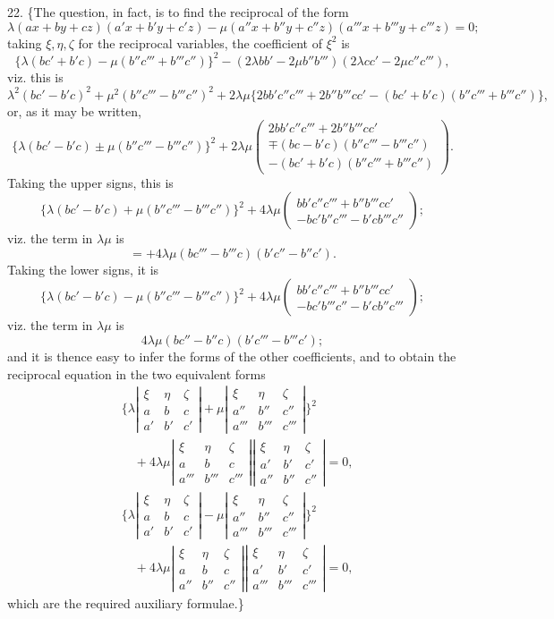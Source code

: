 \documentclass[11pt,a4paper]{article}
\newcommand{\Det}[1]{\left|\begin{matrix}#1\end{matrix}\right|}
\newcommand{\surf}[1]{\par\smallskip\noindent{\itshape \{Surface $#1$.\}}\par\smallskip}
\begin{document}
22. \{The question, in fact, is to find the reciprocal of the form
\[
\lambda(ax+by+cz)(a'x+b'y+c'z)
-\mu(a''x+b''y+c''z)(a'''x+b'''y+c'''z)=0;
\]
taking $\xi,\eta,\zeta$ for the reciprocal variables, the coefficient of $\xi^2$ is
\[
\{\lambda(bc'+b'c)-\mu(b''c'''+b'''c'')\}^2
-(2\lambda bb'-2\mu b''b''')(2\lambda cc'-2\mu c''c'''),
\]
viz. this is
\[
\lambda^2(bc'-b'c)^2+\mu^2(b''c'''-b'''c'')^2
+2\lambda\mu\{2bb'c''c'''+2b''b'''cc'-(bc'+b'c)(b''c'''+b'''c'')\},
\]
or, as it may be written,
\[
\{\lambda(bc'-b'c)\pm\mu(b''c'''-b'''c'')\}^2
+2\lambda\mu
\begin{pmatrix}
2bb'c''c'''+2b''b'''cc'\\
\mp(bc-b'c)(b''c'''-b'''c'')\\
-(bc'+b'c)(b''c'''+b'''c'')
\end{pmatrix}.
\]
Taking the upper signs, this is
\[
\{\lambda(bc'-b'c)+\mu(b''c'''-b'''c'')\}^2
+4\lambda\mu
\begin{pmatrix}
bb'c''c'''+b''b'''cc'\\
-bc'b''c'''-b'cb'''c''
\end{pmatrix};
\]
viz. the term in $\lambda\mu$ is
\[
=+4\lambda\mu(bc'''-b'''c)(b'c''-b''c').
\]
Taking the lower signs, it is
\[
\{\lambda(bc'-b'c)-\mu(b''c'''-b'''c'')\}^2
+4\lambda\mu
\begin{pmatrix}
bb'c''c'''+b''b'''cc'\\
-bc'b'''c''-b'cb''c'''
\end{pmatrix};
\]
viz. the term in $\lambda\mu$ is
\[
4\lambda\mu(bc''-b''c)(b'c'''-b'''c');
\]
and it is thence easy to infer the forms of the other coefficients, and to obtain
the reciprocal equation in the two equivalent forms
\[
\begin{aligned}
&\{\lambda\Det{\xi&\eta&\zeta\\a&b&c\\a'&b'&c'}
+\mu\Det{\xi&\eta&\zeta\\a''&b''&c''\\a'''&b'''&c'''}\}^2\\
&\quad+4\lambda\mu
\Det{\xi&\eta&\zeta\\a&b&c\\a'''&b'''&c'''}
\Det{\xi&\eta&\zeta\\a'&b'&c'\\a''&b''&c''}=0,
\end{aligned}
\]
\[
\begin{aligned}
&\{\lambda\Det{\xi&\eta&\zeta\\a&b&c\\a'&b'&c'}
-\mu\Det{\xi&\eta&\zeta\\a''&b''&c''\\a'''&b'''&c'''}\}^2\\
&\quad+4\lambda\mu
\Det{\xi&\eta&\zeta\\a&b&c\\a''&b''&c''}
\Det{\xi&\eta&\zeta\\a'&b'&c'\\a'''&b'''&c'''}=0,
\end{aligned}
\]
which are the required auxiliary formulae.\}
\surf{abcde\alpha}
\end{document}
